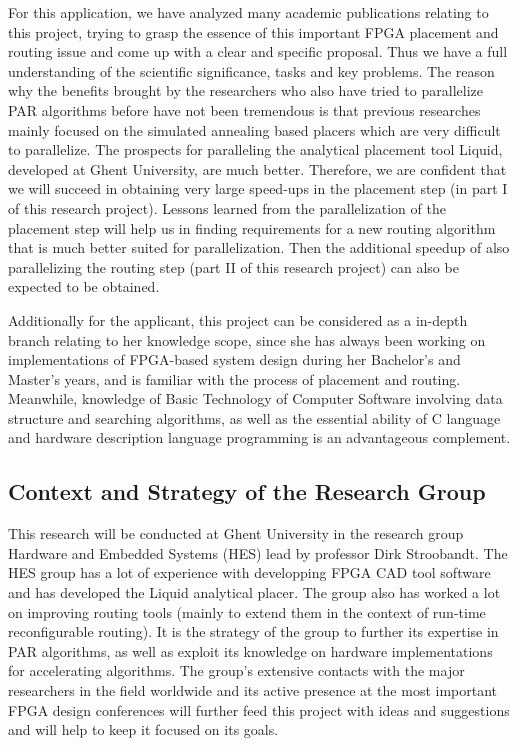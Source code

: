\documentclass[a4paper,oneside,12pt]{article}
\begin{document}
For this application, we have analyzed many academic publications relating to this project, trying to grasp the essence of this important FPGA placement and routing issue and come up with a clear and specific proposal. Thus we have a full understanding of the scientific significance, tasks and key problems. The reason why the benefits brought by the researchers who also have tried to parallelize PAR algorithms before have not been tremendous is that previous researches mainly focused on the simulated annealing based placers which are very difficult to parallelize. The prospects for paralleling the analytical placement tool {\sc Liquid}, developed at Ghent University, are much better. Therefore, we are confident that we will succeed in obtaining very large speed-ups in the placement step (in part I of this research project). Lessons learned from the parallelization of the placement step will help us in finding requirements for a new routing algorithm that is much better suited for parallelization. Then the additional speedup of also parallelizing the routing step (part II of this research project) can also be expected to be obtained.

Additionally for the applicant, this project can be considered as a in-depth branch relating to her knowledge scope, since she has always been working on implementations of FPGA-based system design during her Bachelor's and Master's years, and is familiar with the process of placement and routing. Meanwhile, knowledge of Basic Technology of Computer Software involving data structure and searching algorithms, as well as the essential ability of C language and hardware description language programming is an advantageous complement.

\subsection{Context and Strategy of the Research Group}\label{context}
This research will be conducted at Ghent University in the research group Hardware and Embedded Systems (HES) lead by professor Dirk Stroobandt. The HES group has a lot of experience with developping FPGA CAD tool software and has developed the {\sc Liquid} analytical placer. The group also has worked a lot on improving routing tools (mainly to extend them in the context of run-time reconfigurable routing). It is the strategy of the group to further its expertise in PAR algorithms, as well as exploit its knowledge on hardware implementations for accelerating algorithms. The group's extensive contacts with the major researchers in the field worldwide and its active presence at the most important FPGA design conferences will further feed this project with ideas and suggestions and will help to keep it focused on its goals.
\end{document}
